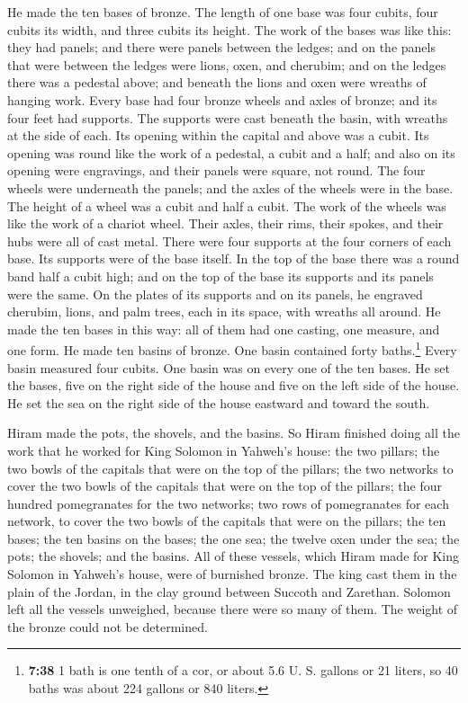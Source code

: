  He made the ten bases of bronze. The length of one base
was four cubits, four cubits its width, and three cubits its height.
 The work of the bases was like this: they had panels;
and there were panels between the ledges;  and on the
panels that were between the ledges were lions, oxen, and cherubim; and
on the ledges there was a pedestal above; and beneath the lions and oxen
were wreaths of hanging work.  Every base had four bronze
wheels and axles of bronze; and its four feet had supports. The supports
were cast beneath the basin, with wreaths at the side of each.
 Its opening within the capital and above was a cubit.
Its opening was round like the work of a pedestal, a cubit and a half;
and also on its opening were engravings, and their panels were square,
not round.  The four wheels were underneath the panels;
and the axles of the wheels were in the base. The height of a wheel was
a cubit and half a cubit.  The work of the wheels was
like the work of a chariot wheel. Their axles, their rims, their spokes,
and their hubs were all of cast metal.  There were four
supports at the four corners of each base. Its supports were of the base
itself.  In the top of the base there was a round band
half a cubit high; and on the top of the base its supports and its
panels were the same.  On the plates of its supports and
on its panels, he engraved cherubim, lions, and palm trees, each in its
space, with wreaths all around.  He made the ten bases in
this way: all of them had one casting, one measure, and one form.
 He made ten basins of bronze. One basin contained forty
baths.\footnote{\textbf{7:38} 1 bath is one tenth of a cor, or about 5.6
  U. S. gallons or 21 liters, so 40 baths was about 224 gallons or 840
  liters.} Every basin measured four cubits. One basin was on every one
of the ten bases.  He set the bases, five on the right
side of the house and five on the left side of the house. He set the sea
on the right side of the house eastward and toward the south.

 Hiram made the pots, the shovels, and the basins. So
Hiram finished doing all the work that he worked for King Solomon in
Yahweh's house:  the two pillars; the two bowls of the
capitals that were on the top of the pillars; the two networks to cover
the two bowls of the capitals that were on the top of the pillars;
 the four hundred pomegranates for the two networks; two
rows of pomegranates for each network, to cover the two bowls of the
capitals that were on the pillars;  the ten bases; the
ten basins on the bases;  the one sea; the twelve oxen
under the sea;  the pots; the shovels; and the basins.
All of these vessels, which Hiram made for King Solomon in Yahweh's
house, were of burnished bronze.  The king cast them in
the plain of the Jordan, in the clay ground between Succoth and
Zarethan.  Solomon left all the vessels unweighed,
because there were so many of them. The weight of the bronze could not
be determined.

